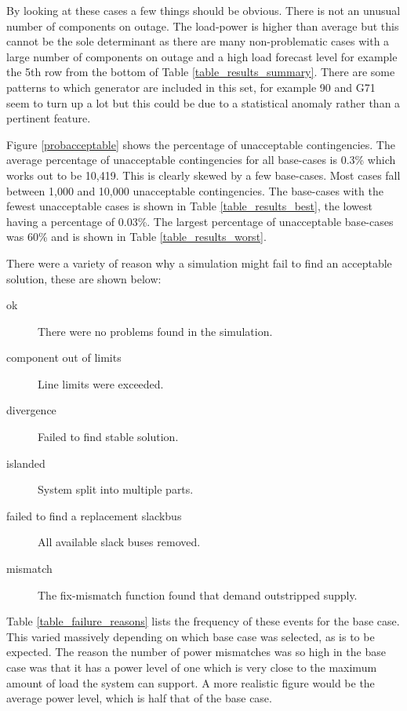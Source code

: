 \documentclass[a4paper,oneside,12pt]{report}
\begin{document}
By looking at these cases a few things should be obvious. There is not an unusual number of components on outage. The load-power is higher than average but this cannot be the sole determinant as there are many non-problematic cases with a large number of components on outage and a high load forecast level for example the 5th row from the bottom of Table \ref{table_results_summary}. There are some patterns to which generator are included in this set, for example 90 and G71 seem to turn up a lot but this could be due to a statistical anomaly rather than a pertinent feature.

Figure \ref{probacceptable} shows the percentage of unacceptable contingencies. The average percentage of unacceptable contingencies for all base-cases is 0.3\% which works out to be 10,419. This is clearly skewed by a few base-cases. Most cases fall between 1,000 and 10,000 unacceptable contingencies. The base-cases with the fewest unacceptable cases is shown in Table \ref{table_results_best}, the lowest having a percentage of 0.03\%. The largest percentage of unacceptable base-cases was 60\% and is shown in Table \ref{table_results_worst}.

There were a variety of reason why a simulation might fail to find an acceptable solution, these are shown below: 

\begin{description}
\item[ok] There were no problems found in the simulation.
\item[component out of limits] Line limits were exceeded.
\item[divergence] Failed to find stable solution.
\item[islanded] System split into multiple parts.
\item[failed to find a replacement slackbus] All available slack buses removed.
\item[mismatch] The fix-mismatch function found that demand outstripped supply.
\end{description}

Table \ref{table_failure_reasons} lists the frequency of these events for the base case. This varied massively depending on which base case was selected, as is to be expected. The reason the number of power mismatches was so high in the base case was that it has a power level of one which is very close to the maximum amount of load the system can support. A more realistic figure would be the average power level, which is half that of the base case. 
\end{document}
